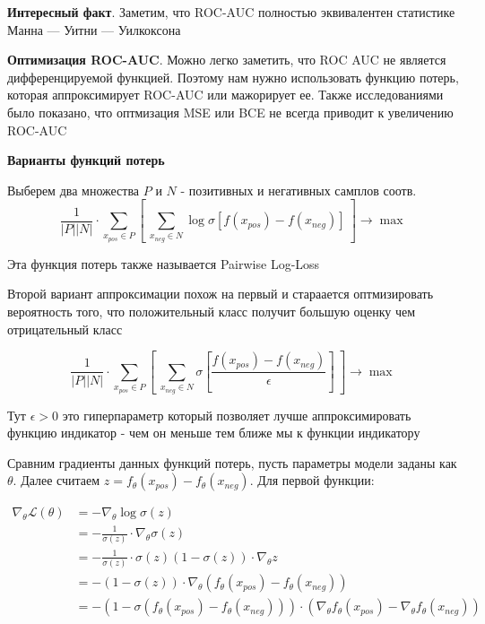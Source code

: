 \documentclass{article}
\begin{document}
    \quad

    \textbf{Интересный факт}. 
    Заметим, что ROC-AUC полностью эквивалентен статистике Манна — Уитни — Уилкоксона 

    \textbf{Оптимизация ROC-AUC}. Можно легко заметить, что ROC AUC не является дифференцируемой функцией. Поэтому нам нужно 
    использовать функцию потерь, которая аппроксимирует ROC-AUC или мажорирует ее. Также исследованиями было показано, что 
    оптмизация MSE или BCE не всегда приводит к увеличению ROC-AUC

    \quad 

    \textbf{Варианты функций потерь}

    \quad 

    Выберем два множества $P$ и $N$ - позитивных и негативных самплов соотв. 
    \begin{equation}
        \frac{1}{|P| |N|}  \cdot \sum_{x_{pos} \in P} [ \ \sum_{x_{neg} \in N} \log\sigma[f(x_{pos}) - f(x_{neg})] \ ] \rightarrow \max
    \end{equation}

    Эта функция потерь также называется Pairwise Log-Loss 

    \quad 

    Второй вариант аппроксимации похож на первый и стараается оптмизировать вероятность того, что положительный класс получит
    большую оценку чем отрицательный класс 

    \begin{equation}
        \frac{1}{|P| |N|}  \cdot \sum_{x_{pos} \in P} [ \ \sum_{x_{neg} \in N} \sigma[\frac{f(x_{pos}) - f(x_{neg})}{\epsilon}] \ ] \rightarrow \max
    \end{equation}

    Тут $\epsilon > 0$ это гиперпараметр который позволяет лучше аппроксимировать функцию индикатор - чем он меньше
    тем ближе мы к функции индикатору

    \quad 

    Сравним градиенты данных функций потерь, пусть параметры модели заданы как $\theta$.
    Далее считаем $z = f_\theta(x_{pos}) - f_\theta(x_{neg})$.
    Для первой функции:

    $$
    \begin{aligned}
    \nabla_\theta \mathcal{L}(\theta) &= -\nabla_\theta \log \sigma(z) \\
    &= -\frac{1}{\sigma(z)} \cdot \nabla_\theta \sigma(z) \\
    &= -\frac{1}{\sigma(z)} \cdot \sigma(z)(1 - \sigma(z)) \cdot \nabla_\theta z \\
    &= -(1 - \sigma(z)) \cdot \nabla_\theta (f_\theta(x_{pos}) - f_\theta(x_{neg})) \\
    &= -(1 - \sigma(f_\theta(x_{pos}) - f_\theta(x_{neg}))) \cdot (\nabla_\theta f_\theta(x_{pos}) - \nabla_\theta f_\theta(x_{neg}))
    \end{aligned}
    $$
\end{document}
